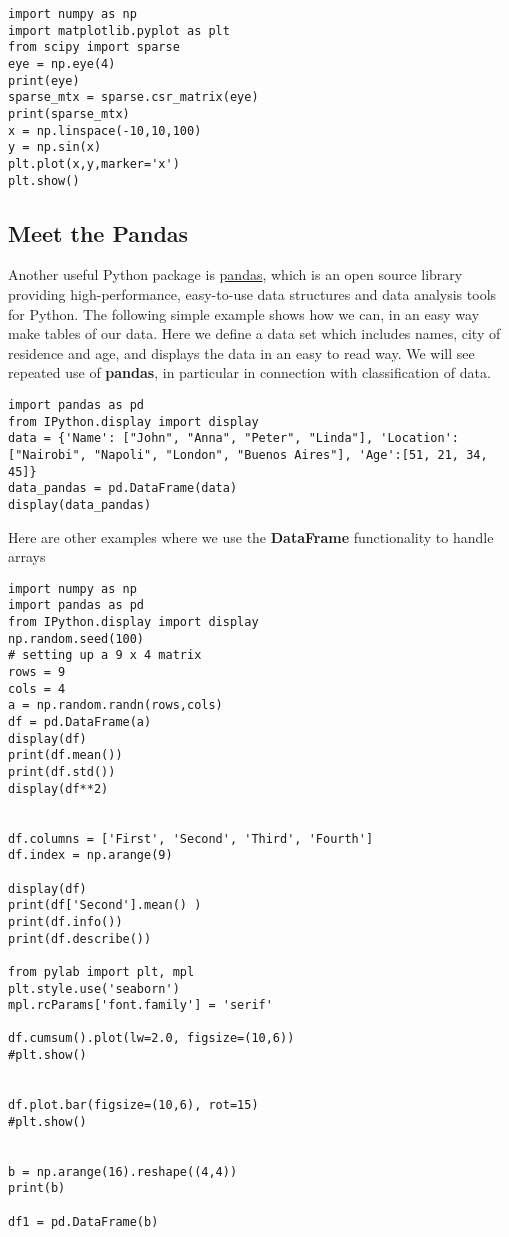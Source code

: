 \documentclass[%
oneside,                 %
final,                   %
10pt]{article}
\begin{document}
\begin{verbatim}
import numpy as np
import matplotlib.pyplot as plt
from scipy import sparse
eye = np.eye(4)
print(eye)
sparse_mtx = sparse.csr_matrix(eye)
print(sparse_mtx)
x = np.linspace(-10,10,100)
y = np.sin(x)
plt.plot(x,y,marker='x')
plt.show()
\end{verbatim}


\subsection*{Meet the Pandas}

Another useful Python package is
\href{{https://pandas.pydata.org/}}{pandas}, which is an open source library
providing high-performance, easy-to-use data structures and data
analysis tools for Python. The following simple example shows how we can, in an easy way make tables of our data. Here we define a data set which includes names, city of residence and age, and displays the data in an easy to read way. We will see repeated use of \textbf{pandas}, in particular in connection with classification of data. 

\begin{verbatim}
import pandas as pd
from IPython.display import display
data = {'Name': ["John", "Anna", "Peter", "Linda"], 'Location': ["Nairobi", "Napoli", "London", "Buenos Aires"], 'Age':[51, 21, 34, 45]}
data_pandas = pd.DataFrame(data)
display(data_pandas)
\end{verbatim}

Here are other examples where we use the \textbf{DataFrame} functionality to handle arrays
\begin{verbatim}
import numpy as np
import pandas as pd
from IPython.display import display
np.random.seed(100)
# setting up a 9 x 4 matrix
rows = 9
cols = 4
a = np.random.randn(rows,cols)
df = pd.DataFrame(a)
display(df)
print(df.mean())
print(df.std())
display(df**2)


df.columns = ['First', 'Second', 'Third', 'Fourth']
df.index = np.arange(9)

display(df)
print(df['Second'].mean() )
print(df.info())
print(df.describe())

from pylab import plt, mpl
plt.style.use('seaborn')
mpl.rcParams['font.family'] = 'serif'

df.cumsum().plot(lw=2.0, figsize=(10,6))
#plt.show()


df.plot.bar(figsize=(10,6), rot=15)
#plt.show()


b = np.arange(16).reshape((4,4))
print(b)

df1 = pd.DataFrame(b)

\end{verbatim}
\end{document}
